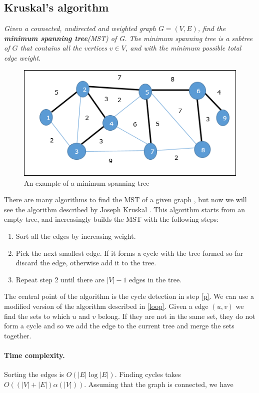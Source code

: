 \documentclass{article}
\begin{document}
\subsection{Kruskal's algorithm}
\emph{Given a connected, undirected  and weighted  graph $G = (V,E)$,
find  the \textbf{minimum spanning tree}(MST) of G. The minimum spanning tree 
is a subtree of $G$ that contains all the vertices $v \in V$, and with the minimum possible total edge weight.}
    
\bigskip
\begin{figure}[h!]
    \centering
    \includegraphics[scale=0.8]{img/mst.png}
    \caption{An example of a minimum spanning tree}
\end{figure}
There are many algorithms to find the MST of a given graph \cite{prim1957shortest} \cite{nevsetvril2001otakar},
but now we will see the algorithm described by Joseph Kruskal \cite{kruskal1956shortest}.
This algorithm starts from an empty tree, and increasingly builds    the MST with the following steps:
\begin{enumerate}
    \item Sort all the edges by increasing weight.
    \item \label{p}Pick the next smallest edge. If it forms a cycle with the  tree formed so far discard the edge, otherwise
    add it to the tree.
    \item Repeat step 2 until there are $|V| - 1$ edges in the tree.
\end{enumerate}
The central point of the algorithm is the cycle detection in step \ref{p}. We can use a modified version of the algorithm described in \ref{loop}.
Given a edge $(u,v)$ we find the sets to which $u$ and $v$ belong. If they are not in the same set, they do not form a cycle 
and so we  add the edge to the current tree and merge the sets together. 
\paragraph{Time complexity.} Sorting the edges is $O(|E|\log|E|)$. Finding cycles takes
$O((|V| + |E|)\alpha(|V|))$. Assuming that the graph is connected, we have
\end{document}

